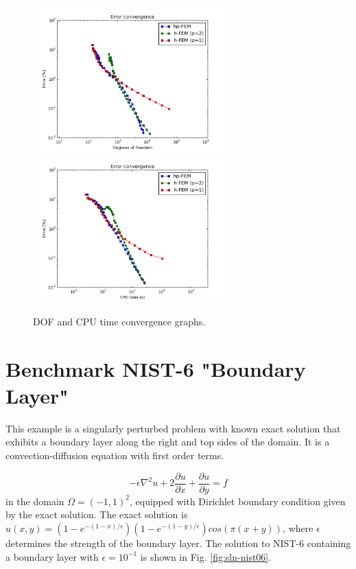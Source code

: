 \documentclass[12pt]{elsarticle}
\begin{document}
\begin{figure}[H]
\centering
\hspace{-50mm}
\includegraphics[width=7.5cm]{nist/nist-5/conv_dof_aniso.png}\ \
\hspace{-10mm}
\includegraphics[width=7.5cm]{nist/nist-5/conv_cpu_aniso.png}
\hspace{-50mm}
\caption{DOF and CPU time convergence graphs.}
\label{fig:nist-5-conv}
\end{figure}


\section{Benchmark NIST-6 "Boundary Layer"}
\label{sec:bench-6}

This example is a singularly perturbed problem with known exact solution that exhibits
a boundary layer along the right and top sides of the domain.
It is a convection-diffusion equation with first order terms.

\begin{equation} \label{boundary-layer}
-\epsilon \nabla^{2} u + 2\frac{\partial u}{\partial x} + \frac{\partial u}{\partial y} = f
\end{equation}
in the domain $\Omega = (-1, 1)^2$, equipped with Dirichlet boundary condition
given by the exact solution. The exact solution is
$u(x,y) = (1 - e^{-(1 - x) / \epsilon})(1 - e^{-(1 - y) / \epsilon})cos(\pi (x + y))$,
where $\epsilon$ determines the strength of the boundary layer.
The solution to NIST-6 containing a boundary layer
with $\epsilon = 10^{-1}$ is shown in Fig. \ref{fig:sln-nist06}.
\end{document}
